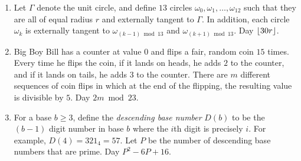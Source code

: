 \begin{enumerate}
    \item Let \( \Gamma \) denote the unit circle, and define \( 13 \) circles
        \( \omega_0,\omega_1,\ldots,\omega_{12} \) such that they are all of
        equal radius \( r \) and externally tangent to \( \Gamma \).  In addition, each circle \(
        \omega_k \) is externally tangent to \( \omega_{(k - 1) \bmod{13}} \) and \( \omega_{(k
        + 1) \bmod{13}} \). Day \( \left\lfloor 30r \right\rfloor \).

    \item Big Boy Bill has a counter at value \( 0 \) and flips a fair, random
        coin \( 15 \) times. Every time he flips the coin, if it lands on
        heads, he adds \( 2 \) to the counter, and if it lands on tails, he
        adds \( 3 \) to the counter. There are \( m \) different sequences of
        coin flips in which at the end of the flipping, the resulting value is
        divisible by \( 5 \). Day \( 2m \bmod{23} \).

    \item For a base \( b \geqslant 3 \), define the \textit{descending base number}
        \( D \left( b \right) \) to be the \( \left( b - 1 \right) \) digit
        number in base \( b \) where the \( i \)th digit is precisely \( i \).
        For example, \( D \left( 4 \right) = 321_4 = 57 \). Let \( P \) be the
        number of descending base numbers that are prime. Day \( P^2 - 6P + 16
        \).
\end{enumerate}

